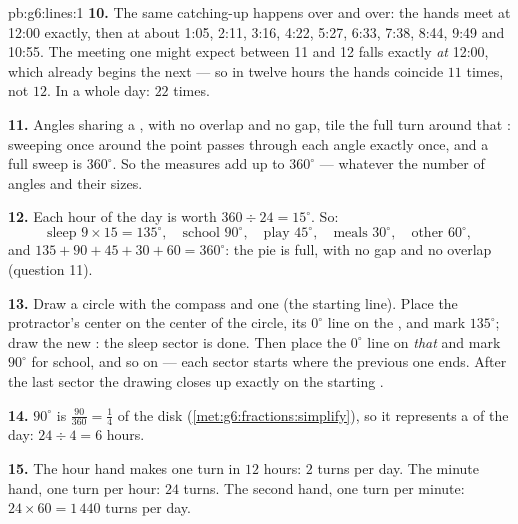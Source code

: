 \begin{solution}{pb:g6:lines:1}
\textbf{10.} The same catching-up happens over and over: the
hands meet at 12:00 exactly, then at about 1:05, 2:11, 3:16,
4:22, 5:27, 6:33, 7:38, 8:44, 9:49 and 10:55. The meeting one
might expect between 11 and 12 falls exactly \emph{at} 12:00,
which already begins the next  --- so in twelve hours the
hands coincide $11$ times, not $12$. In a whole day: $22$ times.

\textbf{11.} Angles sharing a , with no overlap and no
gap, tile the full turn around that : sweeping once around
the point passes through each angle exactly once, and a full
sweep is $360^\circ$. So the measures add up to $360^\circ$ ---
whatever the number of angles and their sizes.

\textbf{12.} Each hour of the day is worth
$360 \div 24 = 15^\circ$. So:
\[
\text{sleep } 9 \times 15 = 135^\circ, \quad
\text{school } 90^\circ, \quad
\text{play } 45^\circ, \quad
\text{meals } 30^\circ, \quad
\text{other } 60^\circ,
\]
and $135 + 90 + 45 + 30 + 60 = 360^\circ$: the pie is full, with
no gap and no overlap (question 11).

\textbf{13.} Draw a circle with the compass and one  (the
starting line). Place the protractor's center on the center of
the circle, its $0^\circ$ line on the , and mark
$135^\circ$; draw the new : the sleep sector is done. Then
place the $0^\circ$ line on \emph{that}  and mark
$90^\circ$ for school, and so on --- each sector starts where
the previous one ends. After the last sector the drawing closes
up exactly on the starting .

\textbf{14.} $90^\circ$ is $\frac{90}{360} = \frac14$ of the
disk (\cref{met:g6:fractions:simplify}), so it represents a
 of the day: $24 \div 4 = 6$ hours.

\textbf{15.} The hour hand makes one turn in $12$ hours: $2$
turns per day. The minute hand, one turn per hour: $24$ turns.
The second hand, one turn per minute: $24 \times 60 = 1\,440$
turns per day.
\end{solution}
